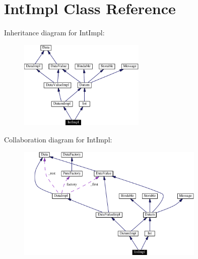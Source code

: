 \hypertarget{classIntImpl}{
\section{Int\-Impl  Class Reference}
\label{classIntImpl}
}
Inheritance diagram for Int\-Impl:\begin{figure}[H]
\begin{center}
\leavevmode
\includegraphics[width=170pt]{classIntImpl__inherit__graph}
\end{center}
\end{figure}
Collaboration diagram for Int\-Impl:\begin{figure}[H]
\begin{center}
\leavevmode
\includegraphics[width=253pt]{classIntImpl__coll__graph}
\end{center}
\end{figure}
